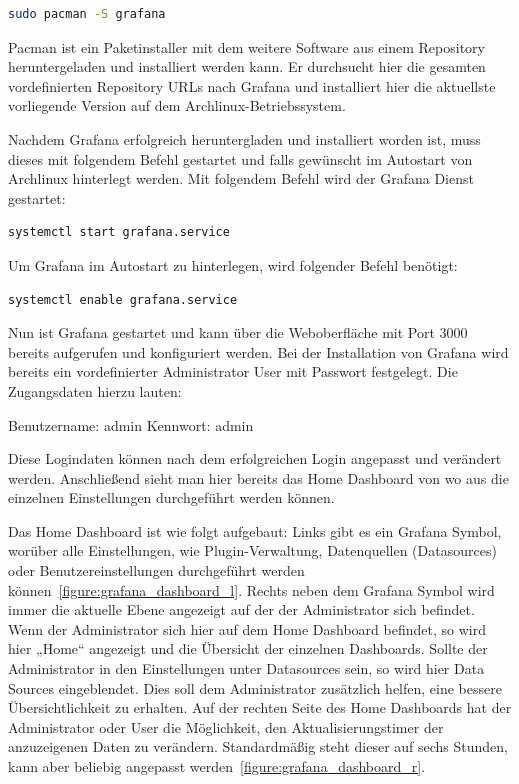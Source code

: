 \begin{lstlisting}[language=bash]
sudo pacman -S grafana
\end{lstlisting}

Pacman ist ein Paketinstaller mit dem weitere Software aus einem Repository
heruntergeladen und installiert werden kann. Er durchsucht hier die gesamten
vordefinierten Repository URLs nach Grafana und installiert hier die aktuellste
vorliegende Version auf dem Archlinux-Betriebssystem.

Nachdem Grafana erfolgreich heruntergladen und installiert worden ist, muss
dieses mit folgendem Befehl gestartet und falls gewünscht im Autostart von
Archlinux hinterlegt werden. Mit folgendem Befehl wird der Grafana Dienst
gestartet:
\begin{lstlisting}[language=bash]
systemctl start grafana.service
\end{lstlisting}

Um Grafana im Autostart zu hinterlegen, wird folgender Befehl benötigt:
\begin{lstlisting}[language=bash]
systemctl enable grafana.service
\end{lstlisting}

Nun ist Grafana gestartet und kann über die Weboberfläche mit Port 3000
bereits aufgerufen und konfiguriert werden. Bei der Installation von Grafana
wird bereits ein vordefinierter Administrator User mit Passwort festgelegt. Die
Zugangsdaten hierzu lauten:

\begin{outline}
  \1 Benutzername: admin
  \1 Kennwort: admin
\end{outline}

Diese Logindaten können nach dem erfolgreichen Login angepasst und verändert
werden. Anschließend sieht man hier bereits das Home Dashboard von wo aus die
einzelnen Einstellungen durchgeführt werden können.

Das Home Dashboard ist wie folgt aufgebaut: Links gibt es ein Grafana Symbol,
worüber alle Einstellungen, wie Plugin-Verwaltung, Datenquellen (Datasources)
oder Benutzereinstellungen durchgeführt werden
können~\ref{figure:grafana_dashboard_l}. Rechts neben dem Grafana Symbol wird
immer die aktuelle Ebene angezeigt auf der der Administrator sich befindet.
Wenn der Administrator sich hier auf dem Home Dashboard befindet, so wird hier
„Home“ angezeigt und die Übersicht der einzelnen Dashboards. Sollte der
Administrator in den Einstellungen unter Datasources sein, so wird hier Data
Sources eingeblendet. Dies soll dem Administrator zusätzlich helfen, eine
bessere Übersichtlichkeit zu erhalten. Auf der rechten Seite des Home
Dashboards hat der Administrator oder User die Möglichkeit, den
Aktualisierungstimer der anzuzeigenen Daten zu verändern. Standardmäßig steht
dieser auf sechs Stunden, kann aber beliebig angepasst
werden~\ref{figure:grafana_dashboard_r}.


